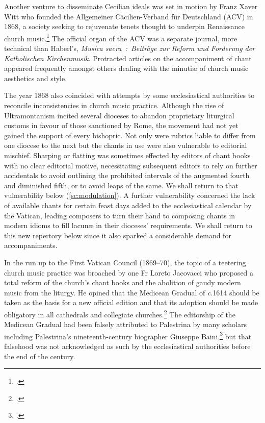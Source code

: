 Another venture to disseminate Cecilian ideals was set in motion by Franz Xaver Witt who founded the Allgemeiner Cäcilien-Verband für Deutschland (ACV) in 1868, a society seeking to rejuvenate tenets thought to underpin Renaissance church music.\footcite[38--40]{GarrattPalestrinaGermanRomantic2002}
The official organ of the ACV was a separate journal, more technical than Haberl's, \emph{Musica sacra~:~Beiträge zur Reform und Forderung der Katholischen Kirchenmusik}.
Protracted articles on the accompaniment of chant appeared frequently amongst others dealing with the minutiæ of church music aesthetics and style.
\noclub[2]

The year 1868 also coincided with attempts by some ecclesiastical authorities to reconcile inconsistencies in church music practice.
Although the rise of Ultramontanism incited several dioceses to abandon proprietary liturgical customs in favour of those sanctioned by Rome, the movement had not yet gained the support of every bishopric.
Not only were rubrics liable to differ from one diocese to the next but the chants in use were also vulnerable to editorial mischief.
Sharping or flatting was sometimes effected by editors of chant books with no clear editorial motive, necessitating subsequent editors to rely on further accidentals to avoid outlining the prohibited intervals of the augmented fourth and diminished fifth, or to avoid leaps of the same.
We shall return to that vulnerability below (\cref{sc:modulation}).
A further vulnerability concerned the lack of available chants for certain feast days added to the ecclesiastical calendar by the Vatican, leading composers to turn their hand to composing chants in modern idioms to fill lacunæ in their dioceses' requirements.
We shall return to this new repertory below since it also sparked a considerable demand for accompaniments.

In the run up to the First Vatican Council (1869--70), the topic of a teetering church music practice was broached by one Fr Loreto Jacovacci who proposed a total reform of the church's chant books and the abolition of gaudy modern music from the liturgy.
He opined that the Medicean Gradual of \emph{c}.1614 should be taken as the basis for a new official edition and that its adoption should be made obligatory in all cathedrals and collegiate churches.\footcite[149]{HayburnPapalLegislationSacred1979}
The editorship of the Medicean Gradual had been falsely attributed to Palestrina by many scholars including Palestrina's nineteenth-century biographer Giuseppe Baini,\footcite[93--5]{BainiMemoriestoricocritichevita1828} but that falsehood was not acknowledged as such by the ecclesiastical authorities before the end of the century.

